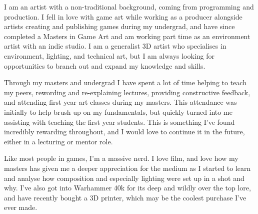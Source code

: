 

\begin{cvparagraph}
    I am an artist with a non-traditional background, coming from programming and production. I fell in love with game art while working as a producer alongside artists creating and publishing games during my undergrad, and have since completed a Masters in Game Art and am working part time as an environment artist with an indie studio. I am a generalist 3D artist who specialises in environment, lighting, and technical art, but I am always looking for opportunities to branch out and expand my knowledge and skills. 
    
    Through my masters and undergrad I have spent a lot of time helping to teach my peers, rewording and re-explaining lectures, providing constructive feedback, and attending first year art classes during my masters. This attendance was initially to help brush up on my fundamentals, but quickly turned into me assisting with teaching the first year students. This is something I've found incredibly rewarding throughout, and I would love to continue it in the future, either in a lecturing or mentor role.


    Like most people in games, I'm a massive nerd. I love film, and love how my masters has given me a deeper appreciation for the medium as I started to learn and analyse how composition and especially lighting were set up in a shot and why. I've also got into Warhammer 40k for its deep and wildly over the top lore, and have recently bought a 3D printer, which may be the coolest purchase I've ever made.
\end{cvparagraph}
